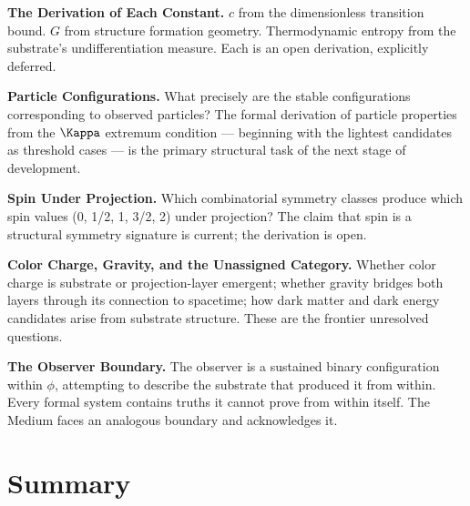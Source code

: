 \documentclass[11pt,letterpaper]{article}
\begin{document}
\textbf{The Derivation of Each Constant.} \(c\) from the dimensionless transition bound. \(G\) from structure formation geometry. Thermodynamic entropy from the substrate's undifferentiation measure. Each is an open derivation, explicitly deferred.

\textbf{Particle Configurations.} What precisely are the stable configurations corresponding to observed particles? The formal derivation of particle properties from the \(\Kappa\) extremum condition --- beginning with the lightest candidates as threshold cases --- is the primary structural task of the next stage of development.

\textbf{Spin Under Projection.} Which combinatorial symmetry classes produce which spin values (0, 1/2, 1, 3/2, 2) under projection? The claim that spin is a structural symmetry signature is current; the derivation is open.

\textbf{Color Charge, Gravity, and the Unassigned Category.} Whether color charge is substrate or projection-layer emergent; whether gravity bridges both layers through its connection to spacetime; how dark matter and dark energy candidates arise from substrate structure. These are the frontier unresolved questions.

\textbf{The Observer Boundary.} The observer is a sustained binary configuration within \(\phi\), attempting to describe the substrate that produced it from within. Every formal system contains truths it cannot prove from within itself. The Medium faces an analogous boundary and acknowledges it.
\section{Summary}
\label{sec:org922658d}
\end{document}
